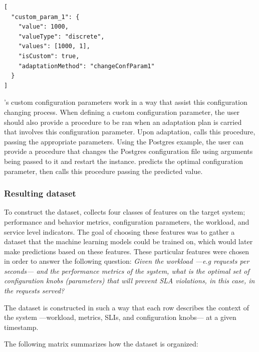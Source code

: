 \begin{lstlisting}[float,floatplacement=H,caption={Example of a custom adaptive configuration definition. Finch will call the procedure changeConfParam1 when it needs to change this specific configuration},label={lst:customadaptiveconfig}]
[
  "custom_param_1": {
    "value": 1000,
    "valueType": "discrete",
    "values": [1000, 1],
    "isCustom": true,
    "adaptationMethod": "changeConfParam1"
  }
]
\end{lstlisting}

\projectname{}'s custom configuration parameters work in a way that assist this configuration changing process. When defining a custom configuration parameter, the user should also provide a procedure to be ran when an adaptation plan is carried that involves this configuration parameter. Upon adaptation, \projectname{} calls this procedure, passing the appropriate parameters. Using the Postgres example, the user can provide a procedure that changes the Postgres configuration file using arguments being passed to it and restart the instance. \projectname{} predicts the optimal configuration parameter, then calls this procedure passing the predicted value.

\subsubsection{Resulting dataset}

To construct the dataset, \projectname{} collects four classes of features on the target system; performance and behavior metrics, configuration parameters, the workload, and service level indicators. The goal of choosing these features was to gather a dataset that the machine learning models could be trained on, which would later make predictions based on these features. These particular features were chosen in order to answer the following question: \textit{Given the workload ---e.g requests per seconds--- and the performance metrics of the system, what is the optimal set of configuration knobs (parameters) that will prevent SLA violations, in this case, in the requests served?}

The dataset is constructed in such a way that each row describes the context of the system ---workload, metrics, SLIs, and configuration knobs--- at a given timestamp.

The following matrix summarizes how the dataset is organized:

\setlength{\arraycolsep}{1pt}
\renewcommand\arraystretch{1.0}
\setcounter{MaxMatrixCols}{20}

